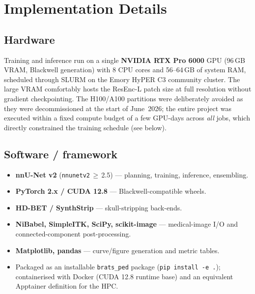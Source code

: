\documentclass[11pt,a4paper]{article}
\begin{document}
\section{Implementation Details}
\label{sec:impl}
\subsection{Hardware}
Training and inference run on a single \textbf{NVIDIA RTX Pro 6000} GPU
(96\,GB VRAM, Blackwell generation) with 8 CPU cores and 56--64\,GB of system RAM,
scheduled through SLURM on the Emory HyPER C3 community cluster. The large VRAM
comfortably hosts the ResEnc-L patch size at full resolution without gradient
checkpointing. The H100/A100 partitions were deliberately avoided as they were
decommissioned at the start of June~2026; the entire project was executed within a
fixed compute budget of a few GPU-days across \emph{all} jobs, which directly
constrained the training schedule (see below).

\subsection{Software / framework}
\begin{itemize}[leftmargin=1.4em,itemsep=1pt]
  \item \textbf{nnU-Net v2} (\texttt{nnunetv2}\,$\ge$\,2.5) --- planning, training,
        inference, ensembling.
  \item \textbf{PyTorch 2.x / CUDA 12.8} --- Blackwell-compatible wheels.
  \item \textbf{HD-BET / SynthStrip} --- skull-stripping back-ends.
  \item \textbf{NiBabel, SimpleITK, SciPy, scikit-image} --- medical-image I/O and
        connected-component post-processing.
  \item \textbf{Matplotlib, pandas} --- curve/figure generation and metric tables.
  \item Packaged as an installable \texttt{brats\_ped} package
        (\texttt{pip install -e .}); containerised with Docker (CUDA 12.8 runtime
        base) and an equivalent Apptainer definition for the HPC.
\end{itemize}
\end{document}

